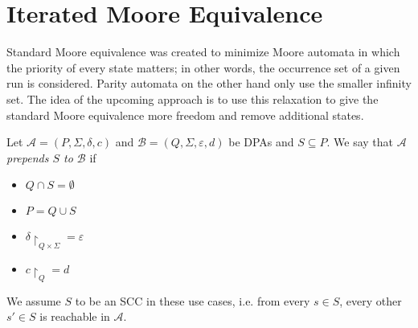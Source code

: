 
\section{Iterated Moore Equivalence}
\label{sect:imoore}

Standard Moore equivalence was created to minimize Moore automata in which the priority of every state matters; in other words, the occurrence set of a given run is considered. Parity automata on the other hand only use the smaller infinity set. The idea of the upcoming approach is to use this relaxation to give the standard Moore equivalence more freedom and remove additional states.

\begin{defn}
	Let $\mathcal{A} = (P, \Sigma, \delta, c)$ and $\mathcal{B} = (Q, \Sigma, \varepsilon, d)$ be DPAs and $S \subseteq P$. We say that \emph{$\mathcal{A}$ prepends $S$ to $\mathcal{B}$} if 
	\begin{itemize}
		\item $Q \cap S = \emptyset$
		\item $P = Q \cup S$
		\item $\delta\upharpoonright_{Q \times \Sigma} = \varepsilon$
		\item $c\upharpoonright_Q = d$
	\end{itemize}
	
	We assume $S$ to be an SCC in these use cases, i.e. from every $s \in S$, every other $s' \in S$ is reachable in $\mathcal{A}$.
\end{defn} 

